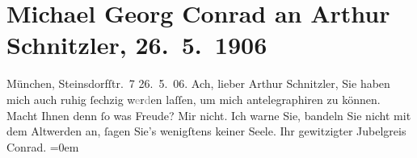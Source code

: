

         
         \renewcommand{\erwaehntePersonen}{Personen: Michael Georg Conrad}
         \renewcommand{\erwaehnteOrte}{Orte: München, Steinsdorfstraße, Wien}
         \renewcommand{\erwaehnteWerke}{}
               \section[Michael Georg Conrad an Arthur Schnitzler, 26. 5. 1906]{ Michael Georg Conrad an Arthur Schnitzler, 26. 5. 1906}\nopagebreak{}\rehead{ }\begin{ledgroupsized}[t]{13cm}\normalsize\beginnumbering{} \toendnotes[C]{\smallbreak\pagebreak[2]} 
\pstart
           \noindent{}{\pb}München, Steinsdorfſtr. 7\pend
           \pstart
           \raggedleft{}26. 5. 06.\pend
           \pstart
           Ach, lieber Arthur Schnitzler, Sie haben mich auch ruhig ſechzig
               w\textcolor{gray}{e}r\textcolor{gray}{d}en laſſen, um mich antelegraphiren zu können. Macht Ihnen denn ſo was Freude? Mir
               nicht. Ich warne Sie, bandeln Sie nicht mit dem Altwerden an, ſagen Sie’s wenigſtens
               keiner Seele.\pend
           \pstart
           Ihr gewitzigter Jubelgreis{\\[\baselineskip]}\spacefill\mbox{Conrad.}\pend
           \leftskip=0em{}
         
         \endnumbering{}\end{ledgroupsized}  \newcommand{\dateiname}{L01599}\newcommand{\titel}{Michael Georg Conrad an Arthur Schnitzler, 26. 5. 1906}\newcommand{\editorInnen}{Martin Anton Müller und Gerd-Hermann Susen}
      